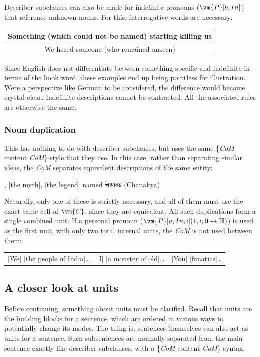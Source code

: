 Describer subclauses can also be made for indefinite pronouns ($\vm{P}[b,In]$) that reference unknown nouns. For this, interrogative words are necessary:
\begin{example}
    \begin{tabular}{c}
        Something (which could not be named) starting killing us\\\hline We heard someone (who remained unseen)
    \end{tabular}
\end{example}
Since English does not differentiate between something specific and indefinite in terms of the hook word, these examples end up being pointless for illustration. Were a perspective like German to be considered, the difference would become crystal clear.  Indefinite descriptions cannot be contracted. All the associated rules are otherwise the same.
\subsubsection{Noun duplication}
This has nothing to do with describer subclauses, but uses the same \{\textit{CoM} content \textit{CoM}\} style that they use. In this case, rather than separating similar ideas, the \textit{CoM} separates equivalent descriptions of the same entity:
\begin{example}
    , [the myth], [the legend] named \textsanskrit{चाणक्य} (Chanakya)
\end{example}
Naturally, only one of these is strictly necessary, and all of them must use the exact same cell of $\vm{C}$, since they are equivalent. All such duplications form a single combined unit. If a personal pronoun ($\vm{P}[a,In,:](1,:,0\leftrightarrow\mathbb{H})$) is used as the first unit, with only two total internal units, the \textit{CoM} is not used between them:
\begin{example}
    \begin{tabular}{c|c|c}
    [We] [the people of India]\ldots & [I] [a monster of old]\ldots & [You] [fanatics]\ldots
    \end{tabular}
\end{example}
\subsection{A closer look at units}
Before continuing, something about units must be clarified. Recall that units are the building blocks for a sentence, which are ordered in various ways to potentially change its modes. The thing is, sentences themselves can also act as units for a sentence. Such subsentences are normally separated from the main sentence exactly like describer subclauses, with a \{\textit{CoM} content \textit{CoM}\} syntax. 

